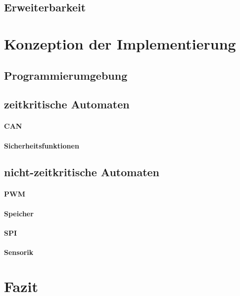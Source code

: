\subsection{Erweiterbarkeit}
\newpage
\section{Konzeption der Implementierung}
\subsection{Programmierumgebung}
\subsection{zeitkritische Automaten}
\paragraph{CAN}
\paragraph{Sicherheitsfunktionen}
\subsection{nicht-zeitkritische Automaten}
\paragraph{PWM}
\paragraph{Speicher}
\paragraph{SPI}
\paragraph{Sensorik}
\newpage
\section{Fazit}
